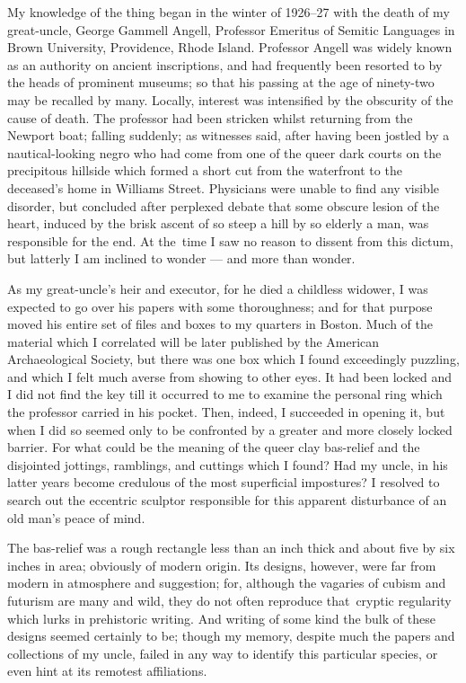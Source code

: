 My knowledge of the thing began in the winter of 1926--27 with the death
of my great-uncle, George Gammell Angell, Professor Emeritus of Semitic
Languages in Brown University, Providence, Rhode Island. Professor
Angell was widely known as an authority on ancient inscriptions, and had
frequently been resorted to by the heads of prominent museums; so that
his passing at the age of ninety-two may be recalled by many. Locally,
interest was intensified by the obscurity of the cause of death. The
professor had been stricken whilst returning from the Newport boat;
falling suddenly; as witnesses said, after having been jostled by a
nautical-looking negro who had come from one of the queer dark courts on
the precipitous hillside which formed a short cut from the waterfront to
the deceased's home in Williams Street. Physicians were unable to find
any visible disorder, but concluded after perplexed debate that some
obscure lesion of the heart, induced by the brisk ascent of so steep a
hill by so elderly a man, was responsible for the end. At the\est\ time I saw
no reason to dissent from this dictum, but latterly I am inclined to
wonder --- and more than wonder.



As my great-uncle's heir and executor, for he died a childless widower,
I was expected to go over his papers with some thoroughness; and for
that purpose moved his entire set of files and boxes to my quarters in
Boston. Much of the material which I correlated will be later published
by the American Archaeological Society, but there was one box which I
found exceedingly puzzling, and which I felt much averse from showing to
other eyes. It had been locked and I did not find the key till it
occurred to me to examine the personal ring which the professor carried
in his pocket. Then, indeed, I succeeded in opening it, but when I did
so seemed only to be confronted by a greater and more closely locked
barrier. For what could be the meaning of the queer clay bas-relief and
the disjointed jottings, ramblings, and cuttings which I found? Had my
uncle, in his latter years become credulous of the most superficial
impostures? I resolved to search out the eccentric sculptor responsible
for this apparent disturbance of an old man's peace of mind.

The bas-relief was a rough rectangle less than an inch thick and about
five by six inches in area; obviously of modern origin. Its designs,
however, were far from modern in atmosphere and suggestion; for,
although the vagaries of cubism and futurism are many and wild, they do
not often reproduce that\est\ cryptic regularity which lurks
in prehistoric
writing. And writing of some kind the bulk of these designs seemed
certainly to be; though my memory, despite much the papers and
collections of my uncle, failed in any way to identify this particular
species, or even hint at its remotest affiliations.

